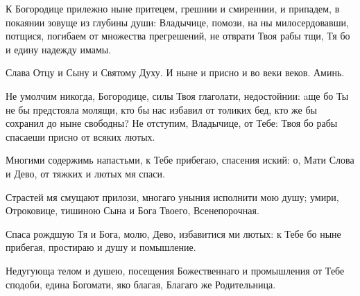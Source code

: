 \mychapterending


\begin{mymulticols}





К Богородице прилежно ныне притецем, грешнии и смиреннии, и припадем, в покаянии зовуще из глубины души: Владычице, помози, на ны милосердовавши, потщися, погибаем от множества прегрешений, не отврати Твоя рабы тщи, Тя бо и едину надежду имамы. 

Слава Отцу и Сыну и Святому Духу. И ныне и присно и во веки веков. Аминь.

Не умолчим никогда, Богородице, силы Твоя глаголати, недостойнии: aще бо Ты не бы предстояла молящи, кто бы нас избавил от толиких бед, кто же бы сохранил до ныне свободны? Не отступим, Владычице, от Тебе: Твоя бо рабы спасаеши присно от всяких лютых.


\PsalmFifty





Многими содержимь напастьми, к Тебе прибегаю, спасения иский: о, Мати Слова и Дево, от тяжких и лютых мя спаси.


Страстей мя смущают прилози, многаго уныния исполнити мою душу; умири, Отроковице, тишиною Сына и Бога Твоего, Всенепорочная.

\slava

Спаса рождшую Тя и Бога, молю, Дево, избавитися ми лютых: к Тебе бо ныне прибегая, простираю и душу и помышление.

\inyne

Недугующа телом и душею, посещения Божественнаго и промышления от Тебе сподоби, едина Богомати, яко благая, Благаго же Родительница.


\end{mymulticols}
